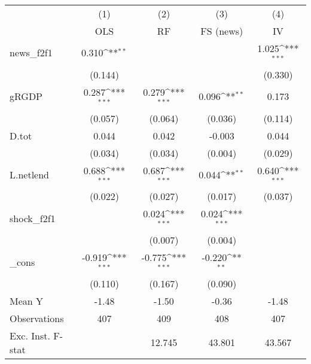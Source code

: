 {
\def\sym#1{\ifmmode^{#1}\else\(^{#1}\)\fi}
\begin{tabular}{l*{4}{c}}
\toprule
            &\multicolumn{1}{c}{(1)}&\multicolumn{1}{c}{(2)}&\multicolumn{1}{c}{(3)}&\multicolumn{1}{c}{(4)}\\
            &\multicolumn{1}{c}{OLS}&\multicolumn{1}{c}{RF}&\multicolumn{1}{c}{FS (news)}&\multicolumn{1}{c}{IV}\\
\midrule
news\_f2f1   &       0.310\sym{**} &                     &                     &       1.025\sym{***}\\
            &     (0.144)         &                     &                     &     (0.330)         \\
\addlinespace
gRGDP       &       0.287\sym{***}&       0.279\sym{***}&       0.096\sym{**} &       0.173         \\
            &     (0.057)         &     (0.064)         &     (0.036)         &     (0.114)         \\
\addlinespace
D.tot       &       0.044         &       0.042         &      -0.003         &       0.044         \\
            &     (0.034)         &     (0.034)         &     (0.004)         &     (0.029)         \\
\addlinespace
L.netlend   &       0.688\sym{***}&       0.687\sym{***}&       0.044\sym{**} &       0.640\sym{***}\\
            &     (0.022)         &     (0.027)         &     (0.017)         &     (0.037)         \\
\addlinespace
shock\_f2f1  &                     &       0.024\sym{***}&       0.024\sym{***}&                     \\
            &                     &     (0.007)         &     (0.004)         &                     \\
\addlinespace
\_cons      &      -0.919\sym{***}&      -0.775\sym{***}&      -0.220\sym{**} &                     \\
            &     (0.110)         &     (0.167)         &     (0.090)         &                     \\
\midrule
Mean Y      &       -1.48         &       -1.50         &       -0.36         &       -1.48         \\
Observations&         407         &         409         &         408         &         407         \\
Exc. Inst. F-stat&                     &      12.745         &      43.801         &      43.567         \\
\bottomrule
\end{tabular}
}
